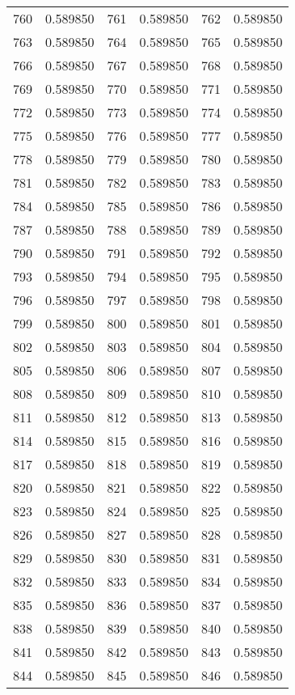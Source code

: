 \documentclass[12pt]{article}
\begin{document}
\begin{longtable}{@{}cc|cc|cc@{}}
760 & 0.589850 & 761 & 0.589850 & 762 & 0.589850 \\
763 & 0.589850 & 764 & 0.589850 & 765 & 0.589850 \\
766 & 0.589850 & 767 & 0.589850 & 768 & 0.589850 \\
769 & 0.589850 & 770 & 0.589850 & 771 & 0.589850 \\
772 & 0.589850 & 773 & 0.589850 & 774 & 0.589850 \\
775 & 0.589850 & 776 & 0.589850 & 777 & 0.589850 \\
778 & 0.589850 & 779 & 0.589850 & 780 & 0.589850 \\
781 & 0.589850 & 782 & 0.589850 & 783 & 0.589850 \\
784 & 0.589850 & 785 & 0.589850 & 786 & 0.589850 \\
787 & 0.589850 & 788 & 0.589850 & 789 & 0.589850 \\
790 & 0.589850 & 791 & 0.589850 & 792 & 0.589850 \\
793 & 0.589850 & 794 & 0.589850 & 795 & 0.589850 \\
796 & 0.589850 & 797 & 0.589850 & 798 & 0.589850 \\
799 & 0.589850 & 800 & 0.589850 & 801 & 0.589850 \\
802 & 0.589850 & 803 & 0.589850 & 804 & 0.589850 \\
805 & 0.589850 & 806 & 0.589850 & 807 & 0.589850 \\
808 & 0.589850 & 809 & 0.589850 & 810 & 0.589850 \\
811 & 0.589850 & 812 & 0.589850 & 813 & 0.589850 \\
814 & 0.589850 & 815 & 0.589850 & 816 & 0.589850 \\
817 & 0.589850 & 818 & 0.589850 & 819 & 0.589850 \\
820 & 0.589850 & 821 & 0.589850 & 822 & 0.589850 \\
823 & 0.589850 & 824 & 0.589850 & 825 & 0.589850 \\
826 & 0.589850 & 827 & 0.589850 & 828 & 0.589850 \\
829 & 0.589850 & 830 & 0.589850 & 831 & 0.589850 \\
832 & 0.589850 & 833 & 0.589850 & 834 & 0.589850 \\
835 & 0.589850 & 836 & 0.589850 & 837 & 0.589850 \\
838 & 0.589850 & 839 & 0.589850 & 840 & 0.589850 \\
841 & 0.589850 & 842 & 0.589850 & 843 & 0.589850 \\
844 & 0.589850 & 845 & 0.589850 & 846 & 0.589850 \\

\end{longtable}
\end{document}
